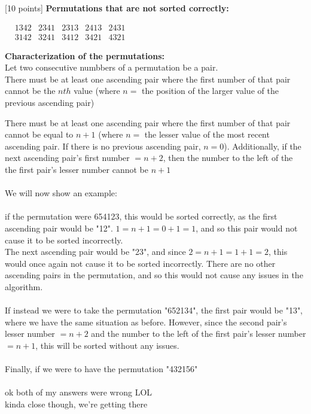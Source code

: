 \documentclass[12pt]{article}
\newcounter{ques}
\newenvironment{question}{\stepcounter{ques}{\noindent\bf Question \arabic{ques}:}}{\vspace{5mm}}
\begin{document}
\begin{question}[10 points]
\textbf{Permutations that are not sorted correctly:}\\
\begin{center}$
  \begin{matrix}
    &1342 &2341 &2313 &2413 &2431\\
    &3142 &3241 &3412 &3421 &4321
  \end{matrix}$
\end{center}


\textbf{Characterization of the permutations:}\\
Let two consecutive numbbers of a permutation be a pair.\\

There must be at least one ascending pair where the first number of that pair cannot be the $nth$ value (where $n=$ the position of the larger value of the previous ascending pair)


There must be at least one ascending pair where the first number of that pair cannot be equal to $n+1$ (where $n=$ the lesser value of the most recent ascending pair. If there is no previous ascending pair, $n=0$). Additionally, if the next ascending pair's first number $=n+2$, then the number to the left of the the first pair's lesser number cannot be $n+1$\\\\
We will now show an example:\\\\
if the permutation were 654123, this would be sorted correctly, as the first ascending pair would be "12". $1=n+1=0+1=1$, and so this pair would not cause it to be sorted incorrectly.\\
The next ascending pair would be "23", and since $2=n+1=1+1=2$, this would once again not cause it to be sorted incorrectly. There are no other ascending pairs in the permutation, and so this would not cause any issues in the algorithm.\\\\
If instead we were to take the permutation "652134", the first pair would be "13", where we have the same situation as before. However, since the second pair's lesser number $=n+2$ and the number to the left of the first pair's lesser number $=n+1$, this will be sorted without any issues.\\\\
Finally, if we were to have the permutation "432156"\\\\
ok both of my answers were wrong LOL\\
kinda close though, we're getting there
\end{question}
\end{document}

